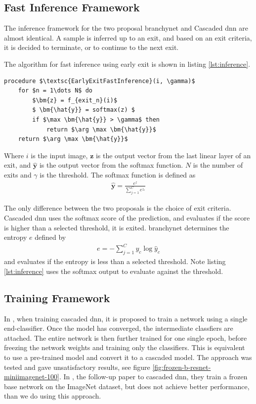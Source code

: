 \subsection{Fast Inference Framework} 

The inference framework for the two proposal \gls{branchynet} and Cascaded \gls{dnn} are almost identical. A sample is inferred up to an exit, and based on an exit criteria, it is decided to terminate, or to continue to the next exit. 

The algorithm for fast inference using early exit is shown in listing \ref{lst:inference}. 

\begin{minipage}{\linewidth}
	\begin{lstlisting}[language = {}, mathescape=true, caption={Early Exit Fast Inference }, label={lst:inference}]
procedure $\textsc{EarlyExitFastInference}(i, \gamma)$
	for $n = 1\dots N$ do
		$\bm{z} = f_{exit_n}(i)$
		$ \bm{\hat{y}} = softmax(z) $
		if $\max \bm{\hat{y}} > \gamma$ then
			return $\arg \max \bm{\hat{y}}$
	return $\arg \max \bm{\hat{y}}$ 
	\end{lstlisting}
\end{minipage}

Where $ i $ is the input image, $ \bm{z} $ is the output vector from the last linear layer of an exit, and $ \bm{\hat{y}} $ is the output vector from the softmax function. $ N $ is the number of exits and $ \gamma $ is the threshold. The softmax function is defined as
\begin{align}
\bm{\hat{y}} = \frac{e^{z}}{\sum_{j=1}^{C}e^{z_c}}
\end{align}

The only difference between the two proposals is the choice of exit criteria. Cascaded \gls{dnn} uses the softmax score of the prediction, and evaluates if the score is higher than a selected threshold, it is exited. \gls{branchynet} determines the entropy $ e $ defined by
\begin{align}
	e = -\sum_{j=1}^{C} y_c \log \hat{y}_c
\end{align}
and evaluates if the entropy is less than a selected threshold. Note listing \ref{lst:inference} uses the softmax output to evaluate against the threshold.

\subsection{Training Framework} 

In \cite{leroux_resource-constrained_2015}, when training cascaded \gls{dnn}, it is proposed to train a network using a single end-classifier. Once the model has converged, the intermediate classfiers are attached. The entire network is then further trained for one single epoch, before freezing the network weights and training only the classifiers. This is equivalent to use a pre-trained model and convert it to a cascaded model. The approach was tested and gave unsatisfactory results, see figure \ref{fig:frozen-b-resnet-miniimagenet-100}. In \cite{leroux_cascading_2017}, the follow-up paper to cascaded \gls{dnn}, they train a frozen base network on the ImageNet dataset, but does not achieve better performance, than we do using this approach.  

